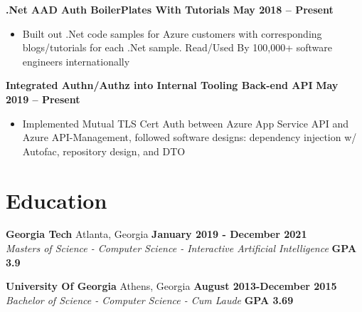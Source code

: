 \documentclass[margin,line]{resume}
\begin{document}
\begin{resume}
	\textbf{.Net AAD Auth BoilerPlates With Tutorials}  \hfill \textbf{May 2018 -- Present}
	\vspace{1mm}
	\begin{itemize}
		\item Built out .Net code samples for Azure customers with corresponding blogs/tutorials for each .Net sample. Read/Used By 100,000+ software engineers internationally
	\end{itemize}
	
	\textbf{Integrated Authn/Authz into Internal Tooling Back-end API}  \hfill \textbf{May 2019 -- Present}
	\vspace{1mm}
	\begin{itemize}
		\item Implemented Mutual TLS Cert Auth between Azure App Service API and Azure API-Management, followed software designs: dependency injection w/ Autofac, repository design, and DTO
	\end{itemize}
	
	\section{\mysidestyle Education}
	
	\textbf{Georgia Tech} Atlanta, Georgia \hfill \textbf{January 2019 - December 2021}\\
	\textsl{Masters of Science - Computer Science - Interactive Artificial Intelligence} \hfill \textbf{GPA 3.9} 
	
	\textbf{University Of Georgia} Athens, Georgia \hfill \textbf{August 2013-December 2015} \\
	\textsl{Bachelor of Science - Computer Science - Cum Laude} \hfill \textbf{GPA 3.69}
	\end{resume}
	
\end{document}
